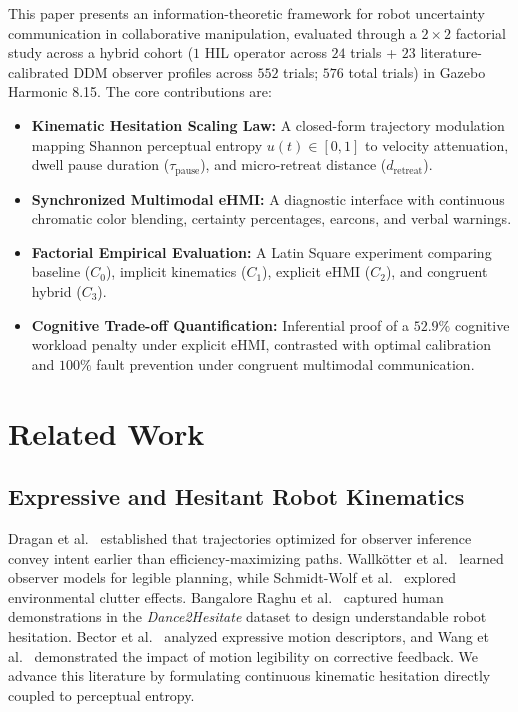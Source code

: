 \documentclass[conference]{IEEEtran}
\begin{document}
This paper presents an information-theoretic framework for robot uncertainty communication in collaborative manipulation, evaluated through a $2 \times 2$ factorial study across a hybrid cohort ($1$ HIL operator across $24$ trials + $23$ literature-calibrated DDM observer profiles across $552$ trials; $576$ total trials) in Gazebo Harmonic 8.15. The core contributions are:
\begin{itemize}
    \item \textbf{Kinematic Hesitation Scaling Law:} A closed-form trajectory modulation mapping Shannon perceptual entropy $u(t) \in [0, 1]$ to velocity attenuation, dwell pause duration ($\tau_{\text{pause}}$), and micro-retreat distance ($d_{\text{retreat}}$).
    \item \textbf{Synchronized Multimodal eHMI:} A diagnostic interface with continuous chromatic color blending, certainty percentages, earcons, and verbal warnings.
    \item \textbf{Factorial Empirical Evaluation:} A Latin Square experiment comparing baseline ($C_0$), implicit kinematics ($C_1$), explicit eHMI ($C_2$), and congruent hybrid ($C_3$).
    \item \textbf{Cognitive Trade-off Quantification:} Inferential proof of a $52.9\%$ cognitive workload penalty under explicit eHMI, contrasted with optimal calibration and $100\%$ fault prevention under congruent multimodal communication.
\end{itemize}

\section{Related Work}
\subsection{Expressive and Hesitant Robot Kinematics}
Dragan et al.~\cite{dragan2013legible} established that trajectories optimized for observer inference convey intent earlier than efficiency-maximizing paths. Wallk{\"o}tter et al.~\cite{wallkotter2022slot} learned observer models for legible planning, while Schmidt-Wolf et al.~\cite{schmidtwolf2024clutter} explored environmental clutter effects. Bangalore Raghu et al.~\cite{raghu2026dance2hesitate} captured human demonstrations in the \textit{Dance2Hesitate} dataset to design understandable robot hesitation. Bector et al.~\cite{bector2026anatomy} analyzed expressive motion descriptors, and Wang et al.~\cite{wang2025effects} demonstrated the impact of motion legibility on corrective feedback. We advance this literature by formulating continuous kinematic hesitation directly coupled to perceptual entropy.
\end{document}
